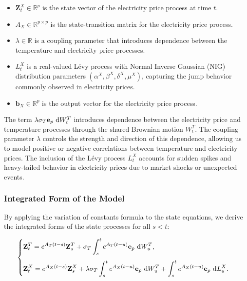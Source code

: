\documentclass[10pt,a4paper,reqno]{amsart}
\theoremstyle{example}
\newcommand*\D{\mathop{}\!\textnormal{d}}
\begin{document}
\begin{itemize}
    \item $\mathbf{Z}_t^X \in \mathbb{R}^p$ is the state vector of the electricity price process at time $t$.
    \item $A_X \in \mathbb{R}^{p \times p}$ is the state-transition matrix for the electricity price process.
    \item $\lambda \in \mathbb{R}$ is a coupling parameter that introduces dependence between the temperature and electricity price processes.
    \item $L_t^X$ is a real-valued L\'evy process with Normal Inverse Gaussian (NIG) distribution parameters $(\alpha^X, \beta^X, \delta^X, \mu^X)$, capturing the jump behavior commonly observed in electricity prices.
    \item $\mathbf{b}_X \in \mathbb{R}^p$ is the output vector for the electricity price process.
\end{itemize}

The term $\lambda \sigma_T \mathbf{e}_p \, \D W_t^T$ introduces dependence between the electricity price and temperature processes through the shared Brownian motion $W_t^T$. The coupling parameter $\lambda$ controls the strength and direction of this dependence, allowing us to model positive or negative correlations between temperature and electricity prices. The inclusion of the L\'evy process $L_t^X$ accounts for sudden spikes and heavy-tailed behavior in electricity prices due to market shocks or unexpected events.

\subsubsection{Integrated Form of the Model}

By applying the variation of constants formula to the state equations, we derive the integrated forms of the state processes for all $s < t$:

\begin{align}
\begin{cases}
\displaystyle \mathbf{Z}_{t}^T = e^{A_T (t - s)} \mathbf{Z}_s^T + \sigma_T \int_s^{t} e^{A_T (t - u)} \mathbf{e}_p \, \D W_u^T, \\[3ex]
\displaystyle \mathbf{Z}_{t}^X = e^{A_X (t - s)} \mathbf{Z}_s^X + \lambda \sigma_T \int_s^{t} e^{A_X (t - u)} \mathbf{e}_p \, \D W_u^T + \int_s^{t} e^{A_X (t - u)} \mathbf{e}_p \, \D L_u^X.
\end{cases} \label{eq:integrated-processes}
\end{align}
\end{document}
